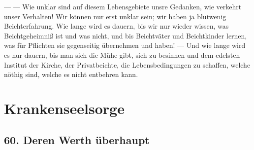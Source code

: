 — — Wie unklar sind auf diesem Lebensgebiete unsre Gedanken, wie verkehrt unser Verhalten! Wir können nur erst unklar sein; wir haben ja blutwenig Beichterfahrung. Wie lange wird es dauern, bis wir nur wieder wissen, was Beichtgeheimniß ist und was nicht, und bis Beichtväter und Beichtkinder lernen, was für Pflichten sie gegenseitig übernehmen und haben! — Und wie lange wird es nur dauern, bis man sich die Mühe gibt, sich zu besinnen und dem edelsten Institut der Kirche, der Privatbeichte, die Lebensbedingungen zu schaffen, welche nöthig sind, welche es nicht entbehren kann.

\chapter{Krankenseelsorge}

\section{60. Deren Werth überhaupt}

